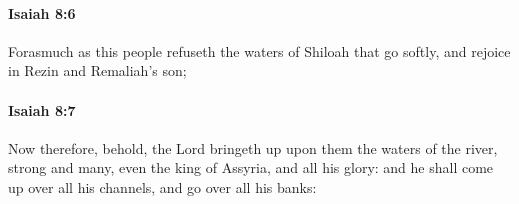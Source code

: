 		\paragraph{Isaiah 8:6} %
			\label{ISAIAH-8-6}

			Forasmuch as this people refuseth the waters of Shiloah that go softly, and rejoice in Rezin and Remaliah's son;


		\paragraph{Isaiah 8:7} %
			\label{ISAIAH-8-7}

			Now therefore, behold, the Lord bringeth up upon them the waters of the river, strong and many, even the king of Assyria, and all his glory: and he shall come up over all his channels, and go over all his banks:


